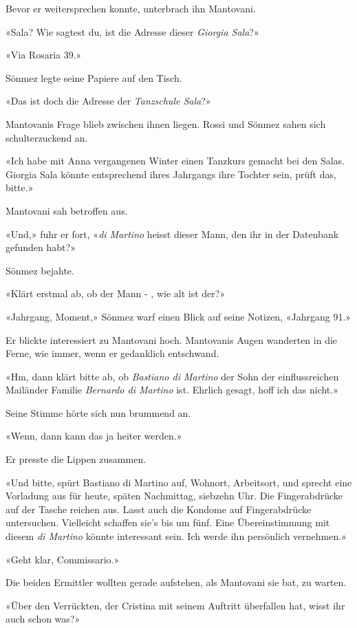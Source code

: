 Bevor er weitersprechen konnte, unterbrach ihn Mantovani.

«Sala? Wie sagtest du, ist die Adresse dieser \emph{Giorgia Sala}?»

«Via Rosaria 39.»

Sönmez legte seine Papiere auf den Tisch.

«Das ist doch die Adresse der \emph{Tanzschule Sala}?»

Mantovanis Frage blieb zwischen ihnen liegen. Rossi und Sönmez sahen
sich schulterzuckend an.

«Ich habe mit Anna vergangenen Winter einen Tanzkurs gemacht bei den
Salas. Giorgia Sala könnte entsprechend ihres Jahrgangs ihre Tochter
sein, prüft das, bitte.»

Mantovani sah betroffen aus.

«Und,» fuhr er fort, «\emph{di Martino} heisst dieser Mann, den ihr in
der Datenbank gefunden habt?»

Sönmez bejahte.

«Klärt erstmal ab, ob der Mann - , wie alt ist der?»

«Jahrgang, Moment,» Sönmez warf einen Blick auf seine Notizen, «Jahrgang
91.»

Er blickte interessiert zu Mantovani hoch.
Mantovanis Augen wanderten in die Ferne, wie immer, wenn er gedanklich
entschwand.

«Hm, dann klärt bitte ab, ob \emph{Bastiano di Martino} der Sohn der
einflussreichen Mailänder Familie \emph{Bernardo di Martino} ist.
Ehrlich gesagt, hoff ich das nicht.»

Seine Stimme hörte sich nun brummend an.

«Wenn, dann kann das ja heiter werden.»

Er presste die Lippen zusammen.

«Und bitte, spürt Bastiano di Martino auf, Wohnort, Arbeitsort, und
sprecht eine Vorladung aus für heute, späten Nachmittag, siebzehn Uhr.
Die Fingerabdrücke auf der Tasche reichen aus. Lasst auch die Kondome auf
Fingerabdrücke untersuchen. Vielleicht schaffen sie’s bis um fünf. Eine
Übereinstimmung mit diesem \emph{di Martino} könnte interessant sein.
Ich werde ihn persönlich vernehmen.»

«Geht klar, Commissario.»

Die beiden Ermittler wollten gerade aufstehen, als Mantovani sie bat, zu
warten.

«Über den Verrückten, der Cristina mit seinem Auftritt überfallen hat,
wisst ihr auch schon was?»

